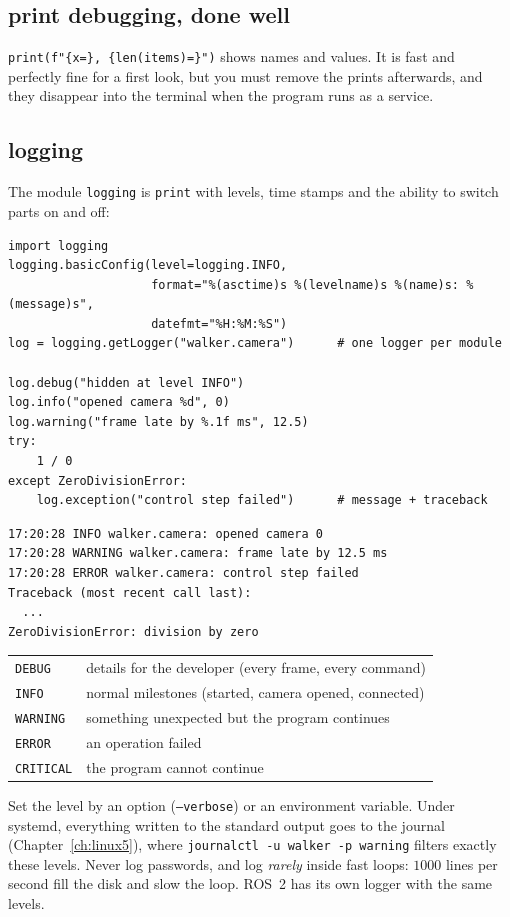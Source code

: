 \subsection*{print debugging, done well}
\verb!print(f"{x=}, {len(items)=}")! shows names and values. It is fast and perfectly fine for a first look, but you must remove the prints afterwards, and they disappear into the terminal when the program runs as a service.

\subsection*{logging}
The module \texttt{logging} is \texttt{print} with levels, time stamps and the ability to switch parts on and off:
\begin{verbatim}
import logging
logging.basicConfig(level=logging.INFO,
                    format="%(asctime)s %(levelname)s %(name)s: %(message)s",
                    datefmt="%H:%M:%S")
log = logging.getLogger("walker.camera")      # one logger per module

log.debug("hidden at level INFO")
log.info("opened camera %d", 0)
log.warning("frame late by %.1f ms", 12.5)
try:
    1 / 0
except ZeroDivisionError:
    log.exception("control step failed")      # message + traceback
\end{verbatim}
\begin{verbatim}
17:20:28 INFO walker.camera: opened camera 0
17:20:28 WARNING walker.camera: frame late by 12.5 ms
17:20:28 ERROR walker.camera: control step failed
Traceback (most recent call last):
  ...
ZeroDivisionError: division by zero
\end{verbatim}
\begin{center}
\renewcommand{\arraystretch}{1.2}
\begin{tabular}{p{2.6cm}p{10.4cm}}
\texttt{DEBUG} & details for the developer (every frame, every command)\\
\texttt{INFO} & normal milestones (started, camera opened, connected)\\
\texttt{WARNING} & something unexpected but the program continues\\
\texttt{ERROR} & an operation failed\\
\texttt{CRITICAL} & the program cannot continue\\
\end{tabular}
\end{center}
Set the level by an option (\texttt{--verbose}) or an environment variable. Under systemd, everything written to the standard output goes to the journal (Chapter~\ref{ch:linux5}), where \texttt{journalctl -u walker -p warning} filters exactly these levels. Never log passwords, and log \emph{rarely} inside fast loops: $1000$ lines per second fill the disk and slow the loop. ROS~2 has its own logger with the same levels.

